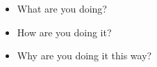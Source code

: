 \begin{itemize}
    \item What are you doing?
    \item How are you doing it?
    \item Why are you doing it this way?
\end{itemize}